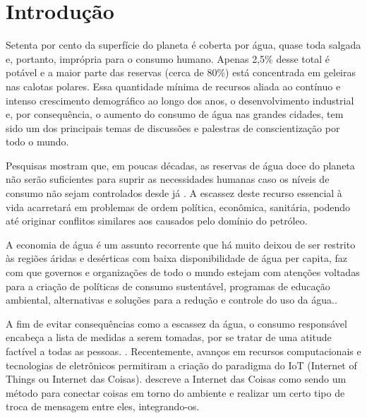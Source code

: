 \chapter[Introdução]{Introdução}

Setenta por cento da superfície do planeta é coberta por água, quase toda salgada e, portanto, imprópria para o consumo humano. Apenas 2,5\% desse total é potável e a maior parte das reservas (cerca de 80\%) está concentrada em geleiras nas calotas polares. 
Essa quantidade mínima de recursos aliada ao contínuo e intenso crescimento demográfico ao longo dos anos, o desenvolvimento industrial e, por consequência, o aumento do consumo de água nas grandes cidades, tem sido um dos principais temas de discussões e palestras de conscientização por todo o mundo.\cite{aguaconsumo}

Pesquisas mostram que, em poucas décadas, as reservas de água doce do planeta não serão suficientes para suprir as necessidades humanas caso os níveis de consumo não sejam controlados desde já \cite{Diarias2007}. A escassez deste recurso essencial à vida acarretará em problemas de ordem política, econômica, sanitária, podendo até originar conflitos similares aos causados pelo domínio do petróleo.

A economia de água é um assunto recorrente que há muito deixou de ser restrito às regiões áridas e desérticas com baixa disponibilidade de água per capita, faz com que governos e organizações de todo o mundo estejam com atenções voltadas para a criação de políticas de consumo sustentável, programas de educação ambiental, alternativas e soluções para a redução e controle do uso da água.\cite{ferreirasistema}.

A fim de evitar consequências como a escassez da água, o consumo
responsável encabeça a lista de medidas a serem tomadas, por se tratar de uma atitude factível a todas as pessoas. \cite{Diarias2007}. Recentemente, avanços em recursos computacionais e tecnologias de eletrônicos permitiram a criação do paradigma do IoT (Internet of Things ou Internet das Coisas). \cite{Perumal2016} descreve a Internet das Coisas como sendo um método para conectar coisas em torno do ambiente e realizar um certo tipo de troca de mensagem entre eles, integrando-os.

